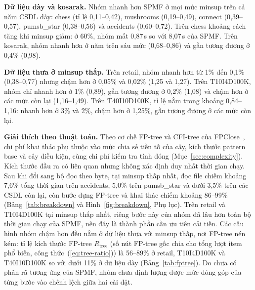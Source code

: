 
\textbf{Dữ liệu dày và kosarak.} Nhóm nhanh hơn SPMF ở mọi mức minsup trên cả năm CSDL dày: chess (tỉ lệ
0{,}11–0{,}42), mushrooms (0{,}19–0{,}49), connect (0{,}39–0{,}57), pumsb\_star (0{,}38–0{,}56) và accidents
(0{,}60–0{,}72). Trên chess khoảng cách tăng khi minsup giảm: ở 60\%, nhóm mất 0{,}87\,s so với 8{,}07\,s của SPMF.
Trên kosarak, nhóm nhanh hơn ở năm trên sáu mức (0{,}68–0{,}86) và gần tương đương ở 0{,}4\% (0{,}98).


\textbf{Dữ liệu thưa ở minsup thấp.} Trên retail, nhóm nhanh hơn từ 1\% đến 0{,}1\% (0{,}38–0{,}77) nhưng chậm hơn ở
0{,}05\% và 0{,}02\% (1{,}25 và 1{,}27). Trên T10I4D100K, nhóm chỉ nhanh hơn ở 1\% (0{,}89), gần tương đương ở
0{,}2\% (1{,}08) và chậm hơn ở các mức còn lại (1{,}16–1{,}49). Trên T40I10D100K, tỉ lệ nằm trong khoảng
0{,}84–1{,}16: nhanh hơn ở 3\% và 2\%, chậm hơn ở 1{,}25\%, gần tương đương ở các mức còn lại.

\textbf{Giải thích theo thuật toán.} Theo cơ chế FP-tree và CFI-tree của FPClose~\cite{grahne2005}, chi phí khai thác
phụ thuộc vào mức chia sẻ tiền tố của cây, kích thước pattern base và cây điều kiện, cùng chi phí kiểm tra tính đóng
(Mục~\ref{sec:complexity}). Kích thước đầu ra có liên quan nhưng không xác định duy nhất thời gian chạy. Sau khi đổi
sang bộ đọc theo byte, tại minsup thấp nhất, đọc file chiếm khoảng 7{,}6\% tổng thời gian trên accidents, 5{,}0\% trên
pumsb\_star và dưới 3{,}5\% trên các CSDL còn lại, còn bước dựng FP-tree và khai thác chiếm khoảng 86–99\%
(Bảng~\ref{tab:breakdown} và Hình~\ref{fig:breakdown}, Phụ lục). Trên retail và T10I4D100K tại minsup thấp nhất,
riêng bước này của nhóm đã lâu hơn toàn bộ thời gian chạy của SPMF, nên đây là thành phần cần ưu tiên cải tiến. Các
cấu hình nhóm chậm hơn đều nằm ở dữ liệu thưa với minsup thấp, nơi FP-tree nén kém: tỉ lệ kích thước FP-tree
$R_{\text{tree}}$ (số nút FP-tree gốc chia cho tổng lượt item phổ biến, công thức~(\ref{eq:tree-ratio})) là
56–89\% ở retail, T10I4D100K và T40I10D100K so với dưới 11\% ở dữ liệu dày (Bảng~\ref{tab:fptree}). Do chưa có phân
rã tương ứng của SPMF, nhóm chưa định lượng được mức đóng góp của từng bước vào chênh lệch giữa hai cài đặt.

